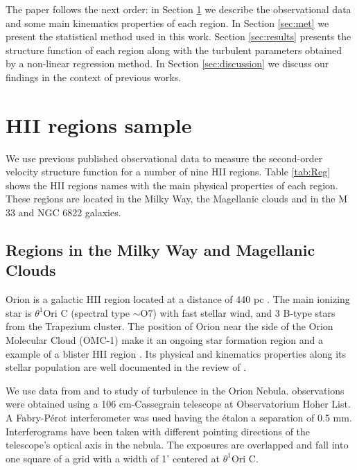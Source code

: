 \documentclass[fleqn,usenatbib, useAMS, a4paper]{mnras}
\begin{document}
The paper follows the next order: in Section \ref{sec:HIIsample} we describe the observational data and some main kinematics properties of each region. In Section \ref{sec:met} we present the statistical method used in this work. Section \ref{sec:results} presents the structure function of each region along with the turbulent parameters obtained by a non-linear regression method. In Section \ref{sec:discussion} we discuss our findings in the context of previous works.   

\section{HII regions sample}\label{sec:HIIsample}

We use previous published observational data to measure the second-order velocity structure function for a number of nine HII regions. 
Table \ref{tab:Reg} shows the HII regions names
with the main physical properties of each region. 
These regions are located in the Milky Way, the Magellanic clouds and in the M 33 and NGC 6822 galaxies.

\subsection{Regions in the Milky Way and Magellanic Clouds}
\label{sec:regions-milky-way}

Orion is a galactic HII region located at a distance of 440 pc \citep{2008AJ....136.1566O}.
The main ionizing star is \(\theta^{1}\)Ori C (spectral type \(\sim\)O7) with fast stellar wind, and 3 B-type stars from the Trapezium cluster.
The position of Orion near the side of the Orion Molecular Cloud (OMC-1) make it an ongoing star formation region and a example of a blister HII region \citep{arthur2016turbulence}.
Its physical and kinematics properties along its stellar population are well documented in the review of \citet{2001ARA&A..39...99O}.

We use data from \citet{1987A&A...176..347H} and \citep{arthur2016turbulence} to study of turbulence in the Orion Nebula.
\cite{1987A&A...176..347H} observations were obtained using a 106 cm-Cassegrain telescope at Observatorium Hoher List. 
A Fabry-Pérot interferometer was used having the étalon a separation of 0.5 mm. 
Interferograms have been taken with different pointing directions of the telescope's optical axis in the nebula. 
The exposures are overlapped and fall into one square of a grid with a width of 1' centered at \(\theta^{1}\)Ori C.   
\end{document}
